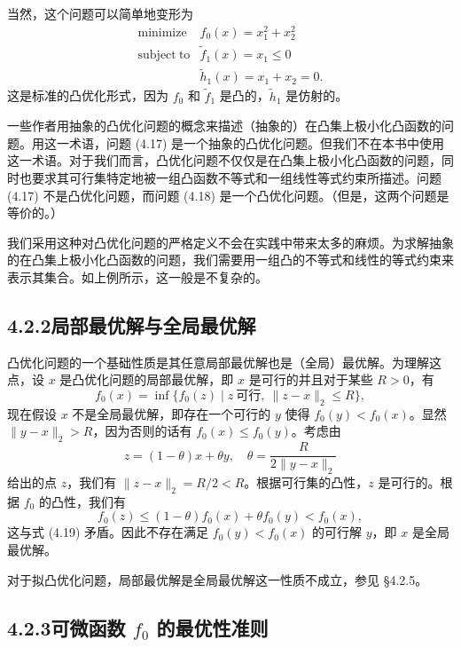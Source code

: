 \documentclass[UTF8,12pt,a4paper,fontset=fandol]{ctexart}
\begin{document}
当然，这个问题可以简单地变形为
\begin{equation}
\begin{array}{ll}
\mathop{\mathrm{minimize}} & f_0(x)=x_1^2+x_2^2\\
\mathrm{subject\ to} & \tilde{f}_1(x)=x_1\leq 0\\
& \tilde{h}_1(x)=x_1+x_2=0.
\end{array}
\tag{4.18}
\end{equation}
这是标准的凸优化形式，因为 $f_0$ 和 $\tilde{f}_1$ 是凸的，$\tilde{h}_1$ 是仿射的。

一些作者用抽象的凸优化问题的概念来描述（抽象的）在凸集上极小化凸函数的问题。用这一术语，问题 (4.17) 是一个抽象的凸优化问题。但我们不在本书中使用这一术语。对于我们而言，凸优化问题不仅仅是在凸集上极小化凸函数的问题，同时也要求其可行集特定地被一组凸函数不等式和一组线性等式约束所描述。问题 (4.17) 不是凸优化问题，而问题 (4.18) 是一个凸优化问题。（但是，这两个问题是等价的。）

我们采用这种对凸优化问题的严格定义不会在实践中带来太多的麻烦。为求解抽象的在凸集上极小化凸函数的问题，我们需要用一组凸的不等式和线性的等式约束来表示其集合。如上例所示，这一般是不复杂的。

\subsection*{4.2.2\quad 局部最优解与全局最优解}

凸优化问题的一个基础性质是其任意局部最优解也是（全局）最优解。为理解这点，设 $x$ 是凸优化问题的局部最优解，即 $x$ 是可行的并且对于某些 $R>0$，有
\begin{equation}
f_0(x)=\inf\{f_0(z)\mid z\ \text{可行},\ \|z-x\|_2\leq R\},
\tag{4.19}
\end{equation}
现在假设 $x$ 不是全局最优解，即存在一个可行的 $y$ 使得 $f_0(y)<f_0(x)$。显然 $\|y-x\|_2>R$，因为否则的话有 $f_0(x)\leq f_0(y)$。考虑由
\[
z=(1-\theta)x+\theta y,\quad \theta=\frac{R}{2\|y-x\|_2}
\]
给出的点 $z$，我们有 $\|z-x\|_2=R/2<R$。根据可行集的凸性，$z$ 是可行的。根据 $f_0$ 的凸性，我们有
\[
f_0(z)\leq (1-\theta)f_0(x)+\theta f_0(y)<f_0(x),
\]
这与式 (4.19) 矛盾。因此不存在满足 $f_0(y)<f_0(x)$ 的可行解 $y$，即 $x$ 是全局最优解。

对于拟凸优化问题，局部最优解是全局最优解这一性质不成立，参见 §4.2.5。

\subsection*{4.2.3\quad 可微函数 $f_0$ 的最优性准则}
\end{document}
